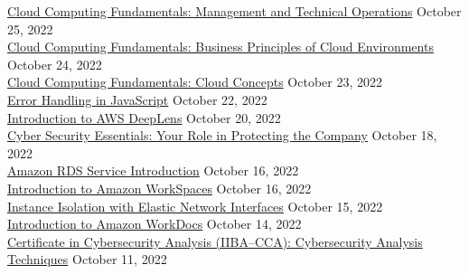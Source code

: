 \documentclass[10pt]{res} %
\begin{document}
\begin{resume}
\href{https://bjdelacruz.dev/files/certificates/pluralsight/3_Cloud_Computing_Fundamentals_Management_and_Technical_Operations.pdf}{\color{blue}Cloud Computing Fundamentals: Management and Technical Operations} \hfill October 25, 2022 \\
\href{https://bjdelacruz.dev/files/certificates/pluralsight/2_Cloud_Computing_Fundamentals_Business_Principles_of_Cloud_Environments.pdf}{\color{blue}Cloud Computing Fundamentals: Business Principles of Cloud Environments} \hfill October 24, 2022 \\
\href{https://bjdelacruz.dev/files/certificates/pluralsight/1_Cloud_Computing_Fundamentals_Cloud_Concepts.pdf}{\color{blue}Cloud Computing Fundamentals: Cloud Concepts} \hfill October 23, 2022 \\
\href{https://bjdelacruz.dev/files/certificates/pluralsight/Error_Handling_in_JavaScript.pdf}{\color{blue}Error Handling in JavaScript} \hfill October 22, 2022 \\
\href{https://bjdelacruz.dev/files/certificates/pluralsight/Introduction_to_AWS_DeepLens.pdf}{\color{blue}Introduction to AWS DeepLens} \hfill October 20, 2022 \\
\href{https://bjdelacruz.dev/files/certificates/pluralsight/Cyber_Security_Essentials_Your_Role_in_Protecting_the_Company.pdf}{\color{blue}Cyber Security Essentials: Your Role in Protecting the Company} \hfill October 18, 2022 \\
\href{https://bjdelacruz.dev/files/certificates/pluralsight/Amazon_RDS_Service_Introduction.pdf}{\color{blue}Amazon RDS Service Introduction} \hfill October 16, 2022 \\
\href{https://bjdelacruz.dev/files/certificates/pluralsight/Introduction_to_Amazon_WorkSpaces.pdf}{\color{blue}Introduction to Amazon WorkSpaces} \hfill October 16, 2022 \\
\href{https://bjdelacruz.dev/files/certificates/pluralsight/Instance_Isolation_with_Elastic_Network_Interfaces.pdf}{\color{blue}Instance Isolation with Elastic Network Interfaces} \hfill October 15, 2022 \\
\href{https://bjdelacruz.dev/files/certificates/pluralsight/Introduction_to_Amazon_WorkDocs.pdf}{\color{blue}Introduction to Amazon WorkDocs} \hfill October 14, 2022 \\
\href{https://bjdelacruz.dev/files/certificates/pluralsight/3_Certificate_in_Cybersecurity_Analysis_IIBA_CCA_Cybersecurity_Analysis_Techniques.pdf}{\color{blue}Certificate in Cybersecurity Analysis (IIBA\textsuperscript{\textregistered}--CCA): Cybersecurity Analysis Techniques} \hfill October 11, 2022 \\

\end{resume}
\end{document}

